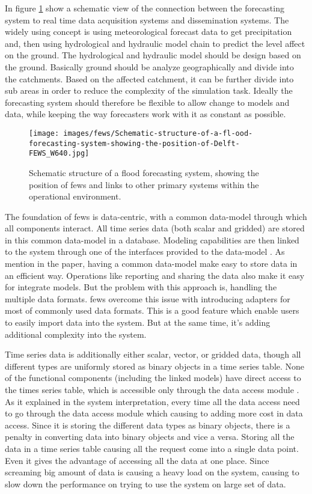 \documentclass[a4paper,oneside,12pt]{report}
\begin{document}
In figure \ref{fi:fews_schematic} show a schematic view of the connection between the forecasting system to real time data acquisition systems and dissemination systems. The widely using concept is using meteorological forecast data to get precipitation and, then using hydrological and hydraulic model chain to predict the level affect on the ground. The hydrological and hydraulic model should be design based on the ground. Basically ground should be analyze geographically and divide into the catchments. Based on the affected catchment, it can be further divide into sub areas in order to reduce the complexity of the simulation task. Ideally the forecasting system should therefore be flexible to allow change to models and data, while keeping the way forecasters work with it as constant as possible.
 
\begin{figure}[htp]
    \centering
    \texttt{[image: images/fews/Schematic-structure-of-a-fl-ood-forecasting-system-showing-the-position-of-Delft-FEWS\_W640.jpg]}\\
    \caption{Schematic structure of a flood forecasting system, showing the position of \acrshort{fews} and links to other primary systems within the operational environment. \cite{Werner2013TheSystem} }
    \label{fi:fews_schematic}
\end{figure}
The foundation of \acrshort{fews} is data-centric, with a common data-model through which all components interact. All time series data (both scalar and gridded) are stored in this common data-model in a database. Modeling capabilities are then linked to the system through one of the interfaces provided to the data-model \cite{Werner2013TheSystem}. As mention in the paper, having a common data-model make easy to store data in an efficient way. Operations like reporting and sharing the data also make it easy for integrate models. But the problem with this approach is, handling the multiple data formats. \acrshort{fews} overcome this issue with introducing adapters for most of commonly used data formats. This is a good feature which enable users to easily import data into the system. But at the same time, it's adding additional complexity into the system.

Time series data is additionally either scalar, vector, or gridded data, though all different types are uniformly stored as binary objects in a time series table. None of the functional components (including the linked models) have direct access to the times series table, which is accessible only through the data access module \cite{Werner2013TheSystem}. As it explained in the system interpretation, every time all the data access need to go through the data access module which causing to adding more cost in data access. Since it is storing the different data types as binary objects, there is a penalty in converting data into binary objects and vice a versa. Storing all the data in a time series table causing all the request come into a single data point. Even it gives the advantage of accessing all the data at one place. Since screaming big amount of data is causing a heavy load on the system, causing to slow down the performance on trying to use the system on large set of data.
\end{document}

